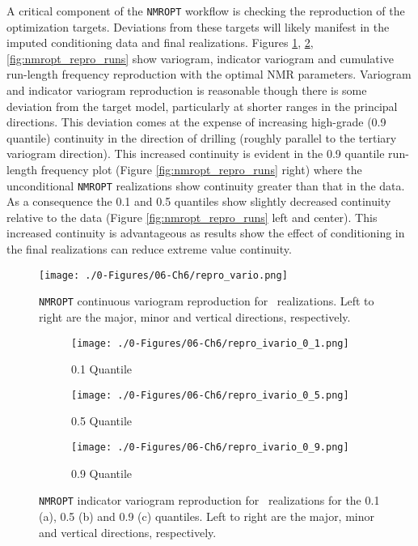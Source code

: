 A critical component of the \texttt{NMROPT} workflow is checking the reproduction of the optimization targets. Deviations from these targets will likely manifest in the imputed conditioning data and final realizations.  Figures \ref{fig:nmropt_repro_vario}, \ref{fig:nmropt_repro_ivario}, \ref{fig:nmropt_repro_runs} show variogram, indicator variogram and cumulative run-length frequency reproduction with the optimal \gls{NMR} parameters. Variogram and indicator variogram reproduction is reasonable though there is some deviation from the target model, particularly at shorter ranges in the principal directions. This deviation comes at the expense of increasing high-grade (0.9 quantile) continuity in the direction of drilling (roughly parallel to the tertiary variogram direction). This increased continuity is evident in the 0.9 quantile run-length frequency plot (Figure \ref{fig:nmropt_repro_runs} right) where the unconditional \texttt{NMROPT} realizations show continuity greater than that in the data. As a consequence the 0.1 and 0.5 quantiles show slightly decreased continuity relative to the data (Figure \ref{fig:nmropt_repro_runs} left and center). This increased continuity is advantageous as results show the effect of conditioning in the final realizations can reduce extreme value continuity.

\begin{figure}[htb!]
    \centering
    \texttt{[image: ./0-Figures/06-Ch6/repro\_vario.png]}
    \caption{\texttt{NMROPT} continuous variogram reproduction for \csnreals \ realizations. Left to right are the major, minor and vertical directions, respectively.}
    \label{fig:nmropt_repro_vario}
\end{figure}

\begin{figure}
    \begin{subfigure}{1.0\textwidth}
        \centering
        \texttt{[image: ./0-Figures/06-Ch6/repro\_ivario\_0\_1.png]}
        \caption{0.1 Quantile}
    \end{subfigure}
    \begin{subfigure}{1.0\textwidth}
        \centering
        \texttt{[image: ./0-Figures/06-Ch6/repro\_ivario\_0\_5.png]}
        \caption{0.5 Quantile}
    \end{subfigure}
    \begin{subfigure}{1.0\textwidth}
        \centering
        \texttt{[image: ./0-Figures/06-Ch6/repro\_ivario\_0\_9.png]}
        \caption{0.9 Quantile}
    \end{subfigure}
    \caption{\texttt{NMROPT} indicator variogram reproduction for \csnreals \ realizations for the 0.1 (a), 0.5 (b) and 0.9 (c) quantiles. Left to right are the major, minor and vertical directions, respectively.}
    \label{fig:nmropt_repro_ivario}
\end{figure}

